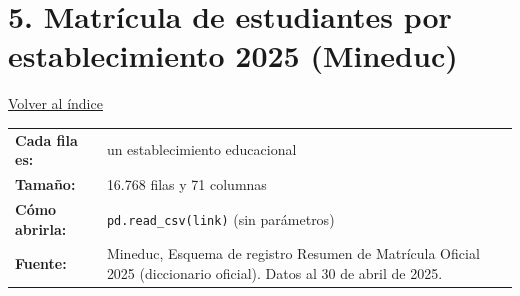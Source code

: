 \documentclass[10.5pt]{article}
\begin{document}
\section*{5. Matrícula de estudiantes por establecimiento 2025 (Mineduc)}
\vspace{-6pt}\hfill{\small\hyperlink{indice}{\textcolor{azuloscuro}{\underline{Volver al índice}}}}\par\vspace{2pt}
\begin{tabularx}{\linewidth}{@{}l X@{}}\textbf{Cada fila es:} & un establecimiento educacional \\\textbf{Tamaño:} & 16.768 filas y 71 columnas \\\textbf{Cómo abrirla:} & \texttt{pd.read\_\allowbreak{}csv(link)} (sin parámetros) \\\textbf{Fuente:} & Mineduc, Esquema de registro Resumen de Matrícula Oficial 2025 (diccionario oficial). Datos al 30 de abril de 2025. \\\end{tabularx}
\vspace{6pt}
\end{document}
